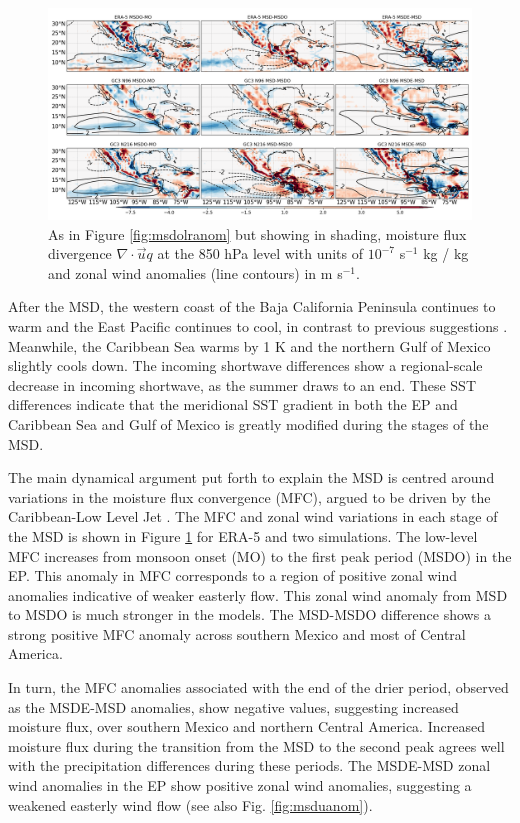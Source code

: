  \begin{figure}[t!]
\includegraphics[width=\linewidth]{figures/modcompar_dif2mfc3}
\caption{As in Figure \ref{fig:msdolranom} but showing in shading, moisture flux divergence $\nabla \cdot \vec{u}q$ at the 850 hPa level with units of $10^{-7}$ s$^{-1}$ kg / kg and zonal wind anomalies (line contours) in m s$^{-1}$.  }
\label{fig:msdmfcanom}
\end{figure}

After the MSD, the western coast of the Baja California Peninsula continues to warm and the East Pacific continues to cool, in contrast to previous suggestions \citep{magana1999,magana2005,herrera2015}. Meanwhile, the Caribbean Sea warms by 1 K and the northern Gulf of Mexico slightly cools down. The incoming shortwave differences show a regional-scale decrease in incoming shortwave, as the summer draws to an end. 
These SST differences indicate that the meridional SST gradient in both the EP and Caribbean Sea and Gulf of Mexico is greatly modified during the stages of the MSD. 


The main dynamical argument put forth to explain the MSD is centred around variations in the moisture flux convergence (MFC), argued to be driven by the Caribbean-Low Level Jet \citep[see e.g.][]{gamble2008,herrera2015,martinez2019}. The MFC and zonal wind variations in each stage of the MSD is shown in Figure \ref{fig:msdmfcanom} for ERA-5 and two simulations. The low-level MFC increases from monsoon onset (MO) to the first peak period (MSDO) in the EP. This anomaly in MFC corresponds to a region of positive zonal wind anomalies indicative of weaker easterly flow.
 This zonal wind anomaly from MSD to MSDO is much stronger in the models.  
The MSD-MSDO difference shows a strong positive MFC anomaly across southern Mexico and most of Central America. 

In turn, the MFC anomalies associated with the end of the drier period, observed as the MSDE-MSD anomalies,  show negative values, suggesting increased moisture flux, over southern Mexico and northern Central America.
Increased moisture flux during the transition from the MSD to the second peak agrees well with the precipitation differences during these periods.  The MSDE-MSD zonal wind anomalies in the EP show positive zonal wind anomalies, suggesting a weakened easterly wind flow (see also Fig. \ref{fig:msduanom}). 

